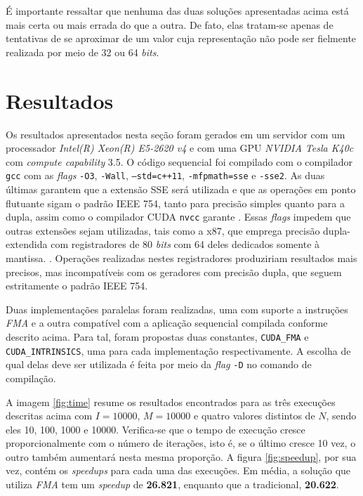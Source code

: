\documentclass[12pt]{article}
\begin{document}
É importante ressaltar que nenhuma das duas soluções apresentadas acima está
mais certa ou mais errada do que a outra. De fato, elas tratam-se apenas de
tentativas de se aproximar de um valor cuja representação não pode ser fielmente
realizada por meio de 32 ou 64 \textit{bits}.

\section{Resultados}

Os resultados apresentados nesta seção foram gerados em um servidor com um
processador \textit{Intel(R) Xeon(R) E5-2620 v4} e com uma GPU \textit{NVIDIA
Tesla K40c} com \textit{compute capability} 3.5. O código sequencial foi
compilado com o compilador \texttt{gcc} com as \textit{flags} \texttt{-O3},
\texttt{-Wall}, \texttt{--std=c++11}, \texttt{-mfpmath=sse} e
\texttt{-sse2}. As duas últimas garantem que a extensão SSE será utilizada e que
as operações em ponto flutuante sigam o padrão IEEE 754, tanto para precisão
simples quanto para a dupla, assim como o compilador CUDA \texttt{nvcc} garante
\cite{ieee754}. Essas \textit{flags} impedem que outras extensões sejam
utilizadas, tais como a x87, que emprega precisão dupla-extendida com
registradores de 80 \textit{bits} com 64 deles dedicados somente à mantissa.
\cite{monniaux:hal-00128124}. Operações realizadas nestes registradores
produziriam resultados mais precisos, mas incompatíveis com os geradores com
precisão dupla, que seguem estritamente o padrão IEEE 754.

Duas implementações paralelas foram realizadas, uma com suporte a instruções
\textit{FMA} e a outra compatível com a aplicação sequencial compilada conforme
descrito acima. Para tal, foram propostas duas constantes, \texttt{CUDA\_FMA}
e \texttt{CUDA\_INTRINSICS}, uma para cada implementação respectivamente. A
escolha de qual delas deve ser utilizada é feita por meio da \textit{flag}
\texttt{-D} no comando de compilação.

A imagem \ref{fig:time} resume os resultados encontrados para
as três execuções descritas acima com \(I = 10000\), \(M = 10000\) e quatro
valores distintos de \(N\), sendo eles 10, 100, 1000 e 10000. Verifica-se que 
o tempo de execução cresce proporcionalmente com o número de iterações, isto é,
se o último cresce 10 vez, o outro também aumentará nesta mesma proporção. A
figura \ref{fig:speedup}, por sua vez, contém os \textit{speedups} para cada uma
das execuções. Em média, a solução que utiliza \textit{FMA} tem um
\textit{speedup} de \textbf{26.821}, enquanto que a tradicional, \textbf{20.622}.
\end{document}
